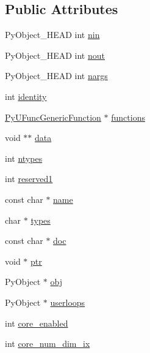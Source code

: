 \subsection*{Public Attributes}
\begin{DoxyCompactItemize}
\item 
Py\+Object\+\_\+\+H\+E\+AD int \hyperlink{struct__tagPyUFuncObject_af3c53cd1c615f06f90b73573f569709d}{nin}
\item 
Py\+Object\+\_\+\+H\+E\+AD int \hyperlink{struct__tagPyUFuncObject_a50287f22915ef1394c0ef9ac1b0873d4}{nout}
\item 
Py\+Object\+\_\+\+H\+E\+AD int \hyperlink{struct__tagPyUFuncObject_ae39e94118b13ed17d6ef0e0027cbe1a7}{nargs}
\item 
int \hyperlink{struct__tagPyUFuncObject_a3a051b99d188ed3ca2fa0c7242d6a0b5}{identity}
\item 
\hyperlink{ufuncobject_8h_a92252cc48bb486d3d9b8504d1495846e}{Py\+U\+Func\+Generic\+Function} $\ast$ \hyperlink{struct__tagPyUFuncObject_ad6bb98e6dc65c30b5971830abcbb3441}{functions}
\item 
void $\ast$$\ast$ \hyperlink{struct__tagPyUFuncObject_a70497d50c11fe2270217bc7316f1af66}{data}
\item 
int \hyperlink{struct__tagPyUFuncObject_a4e1c22d7d754a4a5c041f36207f8f9fc}{ntypes}
\item 
int \hyperlink{struct__tagPyUFuncObject_ae957a691faed6057cefb980eee6b836d}{reserved1}
\item 
const char $\ast$ \hyperlink{struct__tagPyUFuncObject_ad40effa1e61e4d2fa9dbe49f055243af}{name}
\item 
char $\ast$ \hyperlink{struct__tagPyUFuncObject_ae36720bb42508d9a997a1681081fedae}{types}
\item 
const char $\ast$ \hyperlink{struct__tagPyUFuncObject_ac440be9edaf85dbbab8dc2df6b27909a}{doc}
\item 
void $\ast$ \hyperlink{struct__tagPyUFuncObject_a2b2e34930b64b066f06290dd3f96cb19}{ptr}
\item 
Py\+Object $\ast$ \hyperlink{struct__tagPyUFuncObject_ab90c338569fde9a40ebe40c4c0e1a6e7}{obj}
\item 
Py\+Object $\ast$ \hyperlink{struct__tagPyUFuncObject_ac06355984ac7a4c881ea7b9ba9455e89}{userloops}
\item 
int \hyperlink{struct__tagPyUFuncObject_a7a8be218d979426ff649f04782c963a8}{core\+\_\+enabled}
\item 
int \hyperlink{struct__tagPyUFuncObject_a905f057550792d5b86b44e2af16d853f}{core\+\_\+num\+\_\+dim\+\_\+ix}
$$
\end{DoxyCompactItemize}
